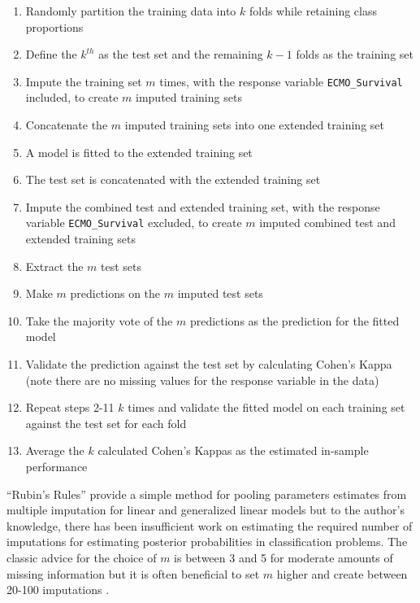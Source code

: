 \documentclass[12pt,]{article}
\providecommand{\tightlist}{%
  \setlength{\itemsep}{0pt}\setlength{\parskip}{0pt}}
\begin{document}
\begin{enumerate}
\def\labelenumi{\arabic{enumi}.}
\tightlist
\item
  Randomly partition the training data into \(k\) folds while retaining
  class proportions
\item
  Define the \(k^{th}\) as the test set and the remaining \(k-1\) folds
  as the training set
\item
  Impute the training set \(m\) times, with the response variable
  \texttt{ECMO\_Survival} included, to create \(m\) imputed training
  sets
\item
  Concatenate the \(m\) imputed training sets into one extended training
  set
\item
  A model is fitted to the extended training set
\item
  The test set is concatenated with the extended training set
\item
  Impute the combined test and extended training set, with the response
  variable \texttt{ECMO\_Survival} excluded, to create \(m\) imputed
  combined test and extended training sets
\item
  Extract the \(m\) test sets
\item
  Make \(m\) predictions on the \(m\) imputed test sets
\item
  Take the majority vote of the \(m\) predictions as the prediction for
  the fitted model
\item
  Validate the prediction against the test set by calculating Cohen's
  Kappa (note there are no missing values for the response variable in
  the data)
\item
  Repeat steps 2-11 \(k\) times and validate the fitted model on each
  training set against the test set for each fold
\item
  Average the \(k\) calculated Cohen's Kappas as the estimated in-sample
  performance
\end{enumerate}

``Rubin's Rules'' \citep{rubin_inference_1976} provide a simple method
for pooling parameters estimates from multiple imputation for linear and
generalized linear models but to the author's knowledge, there has been
insufficient work on estimating the required number of imputations for
estimating posterior probabilities in classification problems. The
classic advice for the choice of \(m\) is between 3 and 5 for moderate
amounts of missing information but it is often beneficial to set \(m\)
higher and create between 20-100 imputations
\citep{van_buuren_flexible_2012}.
\end{document}

